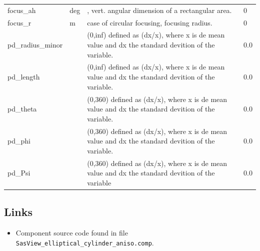 \begin{longtable}{p{}p{}p{}p{}}
focus\_ah & deg & , vert. angular dimension of a rectangular area. & 0 \\
focus\_r & m & case of circular focusing, focusing radius. & 0 \\
pd\_radius\_minor &  & (0,inf) defined as (dx/x), where x is de mean value and dx the standard devition of the variable. & 0.0 \\
pd\_length &  & (0,inf) defined as (dx/x), where x is de mean value and dx the standard devition of the variable. & 0.0 \\
pd\_theta &  & (0,360) defined as (dx/x), where x is de mean value and dx the standard devition of the variable. & 0.0 \\
pd\_phi &  & (0,360) defined as (dx/x), where x is de mean value and dx the standard devition of the variable. & 0.0 \\
pd\_Psi &  & (0,360) defined as (dx/x), where x is de mean value and dx the standard devition of the variable & 0.0 \\
\bottomrule
\end{longtable}

\subsection*{Links}
\begin{itemize}
  \item Component source code found in file \texttt{SasView\_elliptical\_cylinder\_aniso.comp}.
\end{itemize}
